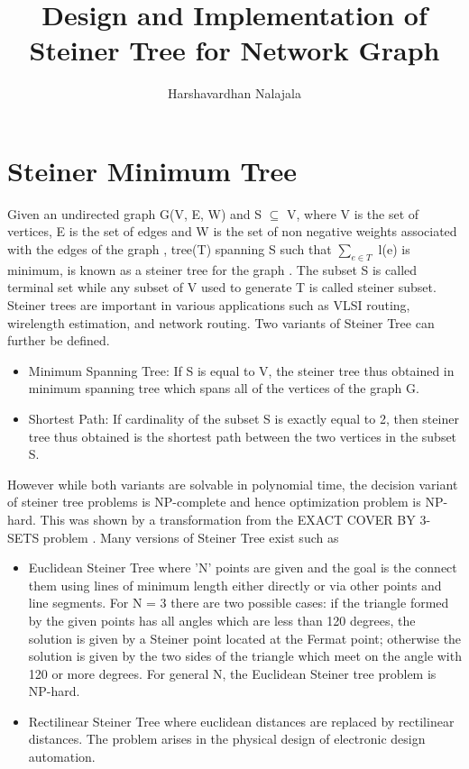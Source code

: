 \documentclass[a4paper]{article}
\begin{document}
	\title{Design and Implementation of Steiner Tree for Network Graph}
	\author{Harshavardhan Nalajala}
	\date{}
	\maketitle
	\tableofcontents

\section{Steiner Minimum Tree}
Given an undirected graph G(V, E, W) and S $\subseteq$ V, where V is the set of vertices, E is the set of edges and W is the set of non negative weights associated with the edges of the graph , tree(T) spanning S such that $\sum_{e \in T}$ l(e) is minimum, is known as a steiner tree for the graph \cite{BOOK}. The subset {S} is called terminal set while any subset of {V} used to generate {T} is called steiner subset. Steiner trees are important in various applications such as VLSI routing, wirelength estimation, and network routing.
Two variants of Steiner Tree can further be defined.
\begin{itemize}
\item Minimum Spanning Tree: If {S} is equal to {V}, the steiner tree thus obtained in minimum spanning tree which spans all of the vertices of the graph {G}.
\item Shortest Path: If cardinality of the subset {S} is exactly equal to 2, then steiner tree thus obtained is the shortest path between the two vertices in the subset {S}.
\end{itemize}
However while both variants are solvable in polynomial time, the decision variant of steiner tree problems is {NP-complete} and hence optimization problem is {NP-hard}. This was shown by a transformation from the EXACT COVER BY 3-SETS problem \cite{NP}. Many versions of Steiner Tree exist such as 
\begin{itemize}
\item Euclidean Steiner Tree where {'N'} points are given and the goal is the connect them using lines of minimum length either directly or via other points and line segments. For N = 3 there are two possible cases: if the triangle formed by the given points has all angles which are less than 120 degrees, the solution is given by a Steiner point located at the Fermat point; otherwise the solution is given by the two sides of the triangle which meet on the angle with 120 or more degrees. For general N, the Euclidean Steiner tree problem is NP-hard.
\item Rectilinear Steiner Tree where euclidean distances are replaced by rectilinear distances. The problem arises in the physical design of electronic design automation.
\end{itemize}
\end{document}
